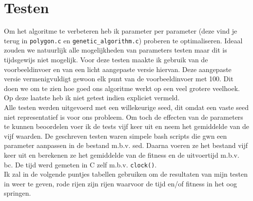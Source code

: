 \documentclass[a4paper]{article}
\begin{document}
\section{Testen}
Om het algoritme te verbeteren heb ik parameter per parameter (deze vind je terug in \verb|polygon.c| en \verb|genetic_algorithm.c|) proberen te optimaliseren. Ideaal zouden we natuurlijk alle mogelijkheden van parameters testen maar dit is tijdsgewijs niet mogelijk. Voor deze testen maakte ik gebruik van de voorbeeldinvoer en van een licht aangepaste versie hiervan. Deze aangepaste versie vermenigvuldigt gewoon elk punt van de voorbeeldinvoer met 100. Dit doen we om te zien hoe goed ons algoritme werkt op een veel grotere veelhoek. Op deze laatste heb ik niet getest indien expliciet vermeld. \\
Alle testen werden uitgevoerd met een willekeurige seed, dit omdat een vaste seed niet representatief is voor ons probleem. Om toch de effecten van de parameters te kunnen beoordelen voer ik de tests vijf keer uit en neem het gemiddelde van de vijf waarden.
De geschreven testen waren simpele bash scripts die gwn een parameter aanpassen in de bestand m.b.v. sed. Daarna voeren ze het bestand vijf keer uit en berekenen ze het gemiddelde van de fitness en de uitvoertijd m.b.v. bc. De tijd werd gemeten in C zelf m.b.v. \verb|clock()|.\\ Ik zal in de volgende puntjes tabellen gebruiken om de resultaten van mijn testen in weer te geven, rode rijen zijn rijen waarvoor de tijd en/of fitness in het oog springen.\par
\end{document}
